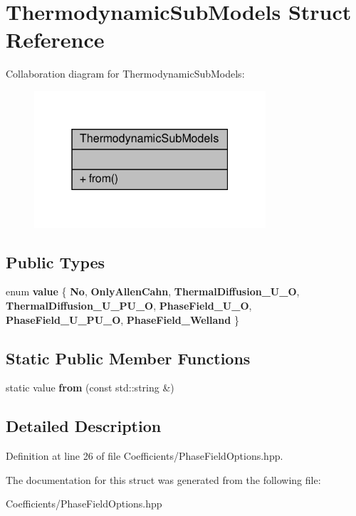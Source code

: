 \hypertarget{structThermodynamicSubModels}{}\section{Thermodynamic\+Sub\+Models Struct Reference}
\label{structThermodynamicSubModels}


Collaboration diagram for Thermodynamic\+Sub\+Models\+:\nopagebreak
\begin{figure}[H]
\begin{center}
\leavevmode
\includegraphics[width=244pt]{structThermodynamicSubModels__coll__graph}
\end{center}
\end{figure}
\subsection*{Public Types}
\begin{DoxyCompactItemize}
\item 
\mbox{\label{structThermodynamicSubModels_a357532b2188420eb3bd95d32fb62be53}} 
enum {\bfseries value} \{ \newline
{\bfseries No}, 
{\bfseries Only\+Allen\+Cahn}, 
{\bfseries Thermal\+Diffusion\+\_\+\+U\+\_\+O}, 
{\bfseries Thermal\+Diffusion\+\_\+\+U\+\_\+\+P\+U\+\_\+O}, 
\newline
{\bfseries Phase\+Field\+\_\+\+U\+\_\+O}, 
{\bfseries Phase\+Field\+\_\+\+U\+\_\+\+P\+U\+\_\+O}, 
{\bfseries Phase\+Field\+\_\+\+Welland}
 \}
\end{DoxyCompactItemize}
\subsection*{Static Public Member Functions}
\begin{DoxyCompactItemize}
\item 
\mbox{\label{structThermodynamicSubModels_a87044ff77db9b28456795eb8bd19419a}} 
static value {\bfseries from} (const std\+::string \&)
\end{DoxyCompactItemize}


\subsection{Detailed Description}


Definition at line 26 of file Coefficients/\+Phase\+Field\+Options.\+hpp.



The documentation for this struct was generated from the following file\+:\begin{DoxyCompactItemize}
\item 
Coefficients/\+Phase\+Field\+Options.\+hpp\end{DoxyCompactItemize}
